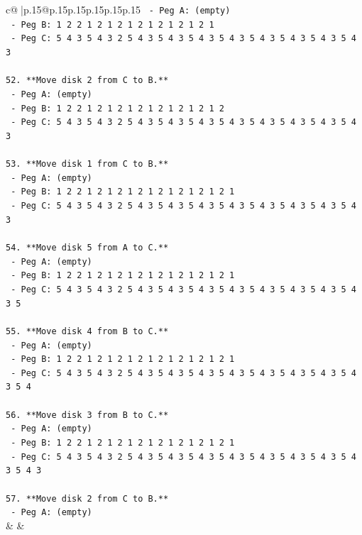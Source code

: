 \documentclass{article}
\begin{document}
{\begin{supertabular}{c@{$\;$}|p{.15\linewidth}@{}p{.15\linewidth}p{.15\linewidth}p{.15\linewidth}p{.15\linewidth}p{.15\linewidth}}
{{{\texttt{    {-} Peg A: (empty)} \\
\texttt{    {-} Peg B: 1 2 2 1 2 1 2 1 2 1 2 1 2 1 2 1} \\
\texttt{    {-} Peg C: 5 4 3 5 4 3 2 5 4 3 5 4 3 5 4 3 5 4 3 5 4 3 5 4 3 5 4 3 5 4 3} \\
\\ 
\texttt{52. **Move disk 2 from C to B.**} \\
\texttt{    {-} Peg A: (empty)} \\
\texttt{    {-} Peg B: 1 2 2 1 2 1 2 1 2 1 2 1 2 1 2 1 2} \\
\texttt{    {-} Peg C: 5 4 3 5 4 3 2 5 4 3 5 4 3 5 4 3 5 4 3 5 4 3 5 4 3 5 4 3 5 4 3} \\
\\ 
\texttt{53. **Move disk 1 from C to B.**} \\
\texttt{    {-} Peg A: (empty)} \\
\texttt{    {-} Peg B: 1 2 2 1 2 1 2 1 2 1 2 1 2 1 2 1 2 1} \\
\texttt{    {-} Peg C: 5 4 3 5 4 3 2 5 4 3 5 4 3 5 4 3 5 4 3 5 4 3 5 4 3 5 4 3 5 4 3} \\
\\ 
\texttt{54. **Move disk 5 from A to C.**} \\
\texttt{    {-} Peg A: (empty)} \\
\texttt{    {-} Peg B: 1 2 2 1 2 1 2 1 2 1 2 1 2 1 2 1 2 1} \\
\texttt{    {-} Peg C: 5 4 3 5 4 3 2 5 4 3 5 4 3 5 4 3 5 4 3 5 4 3 5 4 3 5 4 3 5 4 3 5} \\
\\ 
\texttt{55. **Move disk 4 from B to C.**} \\
\texttt{    {-} Peg A: (empty)} \\
\texttt{    {-} Peg B: 1 2 2 1 2 1 2 1 2 1 2 1 2 1 2 1 2 1} \\
\texttt{    {-} Peg C: 5 4 3 5 4 3 2 5 4 3 5 4 3 5 4 3 5 4 3 5 4 3 5 4 3 5 4 3 5 4 3 5 4} \\
\\ 
\texttt{56. **Move disk 3 from B to C.**} \\
\texttt{    {-} Peg A: (empty)} \\
\texttt{    {-} Peg B: 1 2 2 1 2 1 2 1 2 1 2 1 2 1 2 1 2 1} \\
\texttt{    {-} Peg C: 5 4 3 5 4 3 2 5 4 3 5 4 3 5 4 3 5 4 3 5 4 3 5 4 3 5 4 3 5 4 3 5 4 3} \\
\\ 
\texttt{57. **Move disk 2 from C to B.**} \\
\texttt{    {-} Peg A: (empty)} \\
            }
        }
    }
    & & \\ \\


\end{supertabular}}
\end{document}
